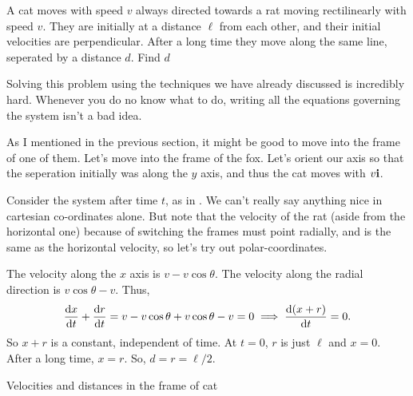         \begin{example}
            A cat moves with speed $v$ always directed towards a rat moving rectilinearly with speed $v$. They are initially at a distance $\ell$ from each other, 
            and their initial velocities are perpendicular. After a long time they move along the same line, seperated
            by a distance $d$. Find $d$ 
            
            \begin{soln}
                    Solving this problem using the techniques we have already discussed is incredibly hard. 
                    Whenever you do no know what to do, writing all the equations governing the system isn't a bad idea.
                    
                    As I mentioned in the previous section, it might be good to move into the frame of one 
                    of them. Let's move into the frame of the fox. Let's orient our axis so that the seperation initially 
                    was along the $y$ axis, and thus the cat moves with $v\mathbf{\boldsymbol{i}}$. 

                    Consider the system after time $t$, as in . We can't really 
                    say anything nice in cartesian co-ordinates alone. But note that the velocity of the rat (aside from the 
                    horizontal one) because of switching the frames must point radially, and is the 
                    same as the horizontal velocity, so let's try out 
                    polar-coordinates. 
                    
                    The velocity along the $x$ axis 
                    is $v - v\cos\theta$. The velocity along the radial direction is $v\cos\theta - v$. Thus,
                    \[
                        \dv{x}{t} + \dv{r}{t} = v - v\cos\theta + v\cos\theta - v = 0 \implies \dv{(x + r)}{t} = 0.
                    \]
                    So $x + r$ is a constant, independent of time. At $t = 0$, $r$ is just $\ell$ and $x = 0$. After a long 
                    time, $x = r$. So, $d = r = \ell/2$. 
            \end{soln}
        \end{example}

    \begin{marginfigure}
        \vspace{-18em}
        \caption{Velocities and distances in the frame of cat}
        \label{fig: fox-chase}
    \end{marginfigure}
        
